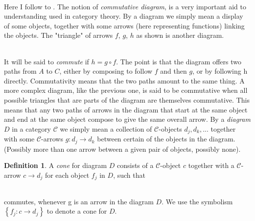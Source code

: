\documentclass[10]{article}
\theoremstyle{plain}
\theoremstyle{definition}
\theoremstyle{definition}
\newtheorem{definition}[prop]{Definition}
\numberwithin{equation}{section}
\newcommand{\7}{\dagger}                     %
\newcommand{\8}{\bullet}                     %
\renewcommand{\.}{\cdot}                     %
\renewcommand{\:}{\colon}                    %
\renewcommand{\:}{\colon}           %
\begin{document}
\begin{appendices}
	\paragraph{} Here I follow to \cite{goldblatt:topoi}. The notion of \textit{commutative diagram}, is a 
	very important aid to understanding used in category theory.
	By a 
	diagram we simply mean a display of some objects, together with some 
	arrows (here representing functions) linking the objects. The "triangle" of 
	arrows $f$, $g$, $h$ as shown is another diagram. 
	\newline
	\\ 	
	It will be said to \textit{commute} if $h = g\circ f$. The point is that the diagram offers 
	two paths from $A$ to $C$, either by composing to follow $f$ and then $g$, or by 
	following h directly. Commutativity means that the two paths amount to 
	the same thing. A more complex diagram, like the previous one, is said to 
	be commutative when all possible triangles that are parts of the diagram 
	are themselves commutative. This means that any two paths of arrows in 
	the diagram that start at the same object and end at the same object 
	compose to give the same overall arrow. By a \textit{diagram} $D$ in a 
	category $\mathscr C$ we simply mean a collection of $\mathscr C$-objects $d_j, d_k,...$ together 
	with some $\mathscr C$-arrows $g: d_j \to d_k$ between certain of the objects in the 
	diagram. (Possibly more than one arrow between a given pair of objects, 
	possibly none).
	\begin{definition}\label{lim_defn}
		A \textit{cone} for diagram $D$ consists of a $\mathscr C$-object $c$ together with a $\mathscr C$-arrow 
		$c\to d_j$ for each object $f_j$ in $D$, such that
		\newline
		\\ 	
		commutes, whenever g is an arrow in the diagram $D$. We use the 
		symbolism $\left\{f_j: c\to d_j\right\}$ to denote a cone for $D$. 
		

\end{definition}
\end{appendices}
\end{document}
